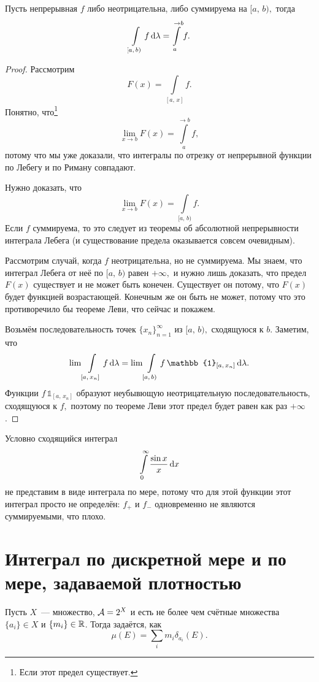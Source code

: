 \documentclass{notes}
\begin{document}
	\begin{thm}
		Пусть непрерывная $f$ либо неотрицательна, либо суммируема на $[a, \, b),$ тогда
		\[
			\int\limits_{[a, \, b)} f\, \mathrm{d} \lambda = \int\limits_a^{\to b} f.
		\]
		\begin{proof}
			Рассмотрим 
			\[
				F(x) = \int\limits_{[a, \, x]} f.
			\]
			Понятно, что\footnote{Если этот предел существует.}
			\[
				\lim\limits_{x \to b} F(x) = \int\limits_a^{\to b} f,
			\]
			потому что мы уже доказали, что интегралы по отрезку от непрерывной функции по Лебегу и по Риману совпадают.

			Нужно доказать, что
			\[
				\lim\limits_{x \to b} F(x) = \int\limits_{[a, \, b)} f.
			\]
			Если $f$ суммируема, то это следует из теоремы об абсолютной непрерывности интеграла Лебега (и существование предела оказывается совсем очевидным).

			Рассмотрим случай, когда $f$ неотрицательна, но не суммируема. Мы знаем, что интеграл Лебега от неё по $[a, \, b)$ равен $+\infty,$ и нужно лишь доказать, что предел $F(x)$ существует и не может быть конечен. Существует он потому, что $F(x)$ будет функцией возрастающей. Конечным же он быть не может, потому что это противоречило бы теореме Леви, что сейчас и покажем.

			Возьмём последовательность точек $\{x_n\}_{n = 1}^{\infty}$ из $[a, \, b),$ сходящуюся к $b$. Заметим, что
			\[
				\lim \int\limits_{[a, \, x_n]} f \D \lambda = \lim \int\limits_{[a, \, b)} f \, \mathbb{1}_{[a, \, x_n]} \D \lambda.
			\] 
			Функции $f \, \mathbb{1}_{[a, \, x_n]}$ образуют неубывющую неотрицательную последовательность, сходящуюся к $f,$ поэтому по теореме Леви этот предел будет равен как раз $+\infty$.
		\end{proof}
	\end{thm}

	\begin{exm}
		Условно сходящийся интеграл
		\[
			\int\limits_{0}^{\infty} \dfrac{\sin x}{x} \, \mathrm{d} x
		\]
		не представим в виде интеграла по мере, потому что для этой функции этот интеграл просто не определён: $f_{+}$ и $f_{-}$ одновременно не являются суммируемыми, что плохо.
	\end{exm}

\section{Интеграл по дискретной мере и по мере, задаваемой плотностью}

	\begin{de}
		Пусть $X$~--- множество, $\mathcal{A} = 2^{X}$ и есть не более чем счётные множества $\{a_i\} \in X$ и $\{m_i\} \in \mathbb{R}$. Тогда  задаётся, как
		\[
			\mu(E) = \sum\limits_{i} m_i \delta_{a_i}(E).
		\]
	\end{de}
\end{document}
